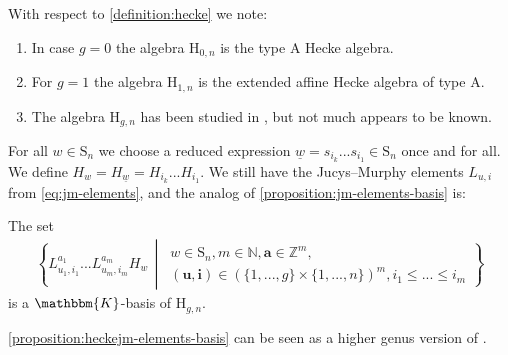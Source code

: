 \documentclass[a4paper,11pt]{amsart}
\renewcommand{\dots}{\text{...}}
\newcommand{\setstuff}[1]{\mathrm{#1}}
\newcommand{\Z}{\mathbb{Z}}
\newcommand{\KK}{\mathbbm{K}}
\newcommand{\N}{\mathbb{N}}
\newcommand{\bsym}[1]{\boldsymbol{#1}}
\newcommand{\jm}{L}
\numberwithin{equation}{section}
\let\fullref\autoref
\begin{document}
\begin{remark}\label{remark:hecke}
With respect to \fullref{definition:hecke} we note:	
\begin{enumerate}

\item In case $g=0$ the algebra $\setstuff{H}_{0,n}$ is the type A Hecke algebra.

\item For $g=1$ the algebra $\setstuff{H}_{1,n}$ is the extended affine Hecke algebra of type A. 

\item The algebra $\setstuff{H}_{g,n}$  
has been studied in \cite{Ba-braid-handlebodies}, 
but not much appears to be known.
\end{enumerate}
\end{remark}

For all $w\in\setstuff{S}_{n}$ we choose a 
reduced expression $\underline{w}=s_{i_{k}}\dots 
s_{i_{1}}\in\setstuff{S}_{n}$ 
once and for all. We define $H_{w}=H_{\underline{w}}=H_{i_{k}}\dots H_{i_{1}}$. 
We still have the Jucys--Murphy elements $\jm_{u,i}$ 
from \eqref{eq:jm-elements}, and the analog of \fullref{proposition:jm-elements-basis} is:

\begin{proposition}\label{proposition:heckejm-elements-basis}
The set
\begin{gather}\label{eq:jm-basis-hecke1}
\left\{ 
\jm_{u_{1},i_{1}}^{a_{1}}\dots 
\jm_{u_{m},i_{m}}^{a_{m}}H_{w} 
\,\middle\vert\,
\begin{gathered}
w\in\setstuff{S}_{n},
m\in\N,
\bsym{a}\in\Z^{m},
\\
(\bsym{u},\bsym{i})\in(\{1,\dots,g\}\times\{1,\dots,n\})^{m},
i_{1}\leq\dots\leq i_{m}
\end{gathered}
\right\}
\end{gather}
is a $\KK$-basis of $\setstuff{H}_{g,n}$.
\end{proposition}

\fullref{proposition:heckejm-elements-basis} can be seen 
as a higher genus version of
\cite[Equation (3.10)]{ArKo-hecke-algebra}.
\end{document}

